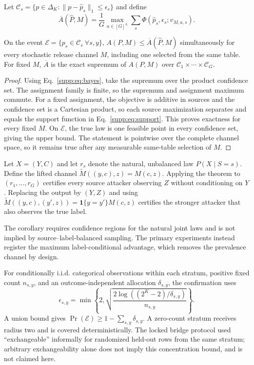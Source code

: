 Let $\mathcal C_s=\{p\in\Delta_K:
\|p-\widehat p_s\|_1\leq\epsilon_s\}$ and define
\begin{equation}
 \overline A(\widehat P,M)=\frac{1}{G}
 \max_{a\in[G]^L}\sum_s
 \Phi(\widehat p_s,\epsilon_s;v_{M,a,s}).
 \label{supp:eq:abar}
\end{equation}

\begin{theorem}
On the event $\mathcal E=\{p_s\in\mathcal C_s\ \forall s,y\}$,
$A(P,M)\leq\overline A(\widehat P,M)$ simultaneously for every stochastic
release channel $M$, including one selected from the same table. For fixed
$M$, $\overline A$ is the exact supremum of $A(P,M)$ over
$\mathcal C_1\times\cdots\times\mathcal C_G$.
\end{theorem}

\begin{proof}
Using Eq.~\eqref{supp:eq:bayes}, take the supremum over the product confidence
set. The assignment family is finite, so the supremum and assignment maximum
commute. For a fixed assignment, the objective is additive in sources and the
confidence set is a Cartesian product, so each source maximization separates
and equals the support function in Eq.~\eqref{supp:eq:support}. This proves
exactness for every fixed $M$. On $\mathcal E$, the true law is one feasible
point in every confidence set, giving the upper bound. The statement is
pointwise over the complete channel space, so it remains true after any
measurable same-table selection of $M$.
\end{proof}

\begin{corollary}
Let $X=(Y,C)$ and let $r_s$ denote the natural, unbalanced law
$P(X\mid S=s)$. Define the lifted channel
$\widetilde M((y,c),z)=M(c,z)$. Applying the theorem to
$(r_1,\ldots,r_G)$ certifies every source attacker observing $Z$ without
conditioning on $Y$. Replacing the output by $(Y,Z)$ and using
$\widetilde M((y,c),(y',z))=\mathbf1\{y=y'\}M(c,z)$ certifies the stronger
attacker that also observes the true label.
\end{corollary}

The corollary requires confidence regions for the natural joint laws and is
not implied by source--label-balanced sampling. The primary experiments instead
register the maximum label-conditional advantage, which removes the prevalence
channel by design.

For conditionally i.i.d. categorical observations within each stratum,
positive fixed count $n_{s,y}$, and an outcome-independent allocation
$\delta_{s,y}$, the confirmation uses
\begin{equation}
 \epsilon_{s,y}=\min\left\{2,
 \sqrt{\frac{2\log((2^K-2)/\delta_{s,y})}{n_{s,y}}}\right\}.
 \label{supp:eq:weissman}
\end{equation}
A union bound gives $\Pr(\mathcal E)\geq1-\sum_{s,y}\delta_{s,y}$. A zero-count
stratum receives radius two and is covered deterministically. The locked bridge
protocol used ``exchangeable'' informally for randomized held-out rows from the
same stratum; arbitrary exchangeability alone does not imply this concentration
bound, and is not claimed here.

